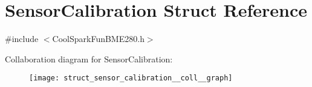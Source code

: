 \hypertarget{struct_sensor_calibration}{}\section{Sensor\+Calibration Struct Reference}
\label{struct_sensor_calibration}


{\ttfamily \#include $<$Cool\+Spark\+Fun\+B\+M\+E280.\+h$>$}



Collaboration diagram for Sensor\+Calibration\+:\nopagebreak
\begin{figure}[H]
\begin{center}
\leavevmode
\texttt{[image: struct\_sensor\_calibration\_\_coll\_\_graph]}
\end{center}
\end{figure}
